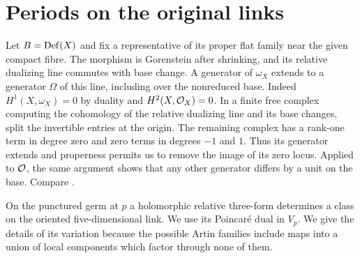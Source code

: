 \section{Periods on the original links}\label{sec:periods}

Let $B=\operatorname{Def}(X)$ and fix a representative of its proper flat family near
the given compact fibre. The morphism is Gorenstein after shrinking,
and its relative dualizing line commutes with base change. A generator
of $\omega_X$ extends to a generator $\Omega$ of this line, including
over the nonreduced base. Indeed $H^1(X,\omega_X)=0$ by duality and
$H^2(X,\mathcal O_X)=0$. In a finite free complex computing the cohomology of
the relative dualizing line and its base changes, split the invertible
entries at the origin. The remaining complex has a rank-one term in
degree zero and zero terms in degrees $-1$ and $1$. Thus its generator
extends and properness permits us to remove the image of its zero
locus. Applied to $\mathcal O$, the same argument shows that any other
generator differs by a unit on the base. Compare \cite[Lemma~3.1]{Friedman}.

On the punctured germ at $p$ a holomorphic relative three-form
determines a class on the oriented five-dimensional link. We use its
Poincar\'e dual in $V_p$. We give the details of its variation because
the possible Artin families include maps into a union of local
components which factor through none of them.

